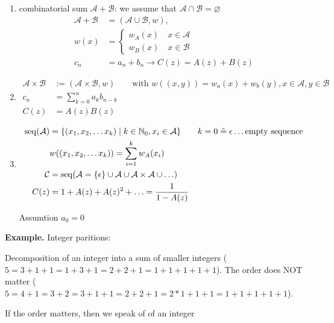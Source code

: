 \begin{enumerate}[1)]
\item combinatorial sum $\mathcal{A} + \mathcal{B}$:
    we assume that $\mathcal{A} \cap \mathcal{B} = \varnothing$
    \begin{align*}
        \mathcal{A} + \mathcal{B} &= (\mathcal{A} \cup \mathcal{B} , w), \\
        w(x) &= \begin{cases}
            {w_A(x) \quad x \in \mathcal{A}}\\
            {w_B(x) \quad x \in \mathcal{B}}
			\end{cases}\\
        c_n &= a_n + b_ n\rightarrow C(z) = A(z) + B(z)
    \end{align*}
\item 
    \begin{align*}
        \mathcal{A} \times \mathcal{B} 
        &:= (\mathcal{A} \times \mathcal{B}, w) 
        \qquad \text{with } w((x,y)) = w_a(x) + w_b(y), x\in \mathcal{A}, y\in \mathcal{B}\\
        c_n &= \sum_{k=0}^n a_kb_{n-k}\\
        C(z) &= A(z)B(z)
    \end{align*}

\item
    \begin{align*}
        \operatorname{seq}(\mathcal{A}) &= \{ (x_1, x_2, \ldots x_k) \mid k \in \mathbb{N}_0, x_i \in \mathcal{A}\}
        \qquad k = 0 \mathrel{\hat{=}} \epsilon \ldots \text{empty sequence}\\
        &w((x_1, x_2, \ldots x_k) ) = \sum_{i=1}^{k} w_A(x_i) \\
        \mathcal{C} &= \operatorname{seq}(\mathcal{A} = \{\epsilon\} \cup \mathcal{A} \cup \mathcal{A}\times\mathcal{A} \cup \ldots )\\
        C(z) &= 1 + A(z) + A(z)^2 + \ldots = \frac{1}{1-A(z)} \\
    \end{align*}
    
    Assumtion $a_0 = 0$
\end{enumerate}

\textbf{Example.}
Integer paritions:

Decomposition of an integer into a sum of smaller integers ($5 = 3+1+1= 1+3+1 = 2+2+1 = 1+1+1+1+1$). The order does NOT matter ($5= 4+1 = 3 + 2 = 3+1+1 = 2+2+1 = 2*1+1+1 = 1+1+1+1+1$). 

If the order matters, then we speak of  of an integer

